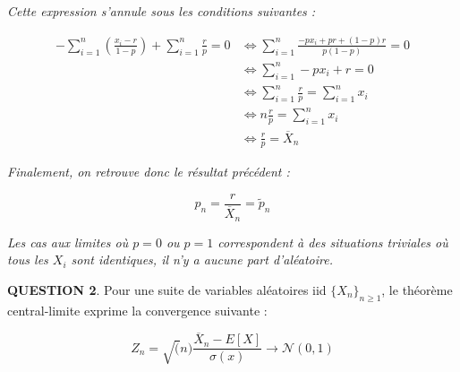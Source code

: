 \documentclass[a4paper,11pt]{article}
\newcommand{\quest}[1]{\small\textbf{#1}\normalsize}
\theoremstyle{nonumberplain}
\theoremstyle{nonumberplain}
\theoremstyle{nonumberplain}
\begin{document}
\begin{calculs}
        \newpage
        \emph{}\newline
        \emph{Cette expression s'annule sous les conditions suivantes :}

        \vspace{-2ex}
        \begin{equation*}
        \begin{split}
            - \sum\limits_{i = 1}^{n} (\frac{x_i - r}{1 - p}) + \sum\limits_{i = 1}^{n} \frac{r}{p} = 0 & \iff \sum\limits_{i = 1}^{n} \frac{-px_i + pr + (1 - p)r}{p(1-p)} = 0 \\
              & \iff \sum\limits_{i = 1}^{n} -px_i + r = 0 \\
              & \iff \sum\limits_{i = 1}^{n} \frac{r}{p} = \sum\limits_{i = 1}^{n} x_i \\
              & \iff n\frac{r}{p} = \sum\limits_{i = 1}^{n} x_i \\
              & \iff \frac{r}{p} = \overline{X}_n
        \end{split}
        \end{equation*}

        \emph{Finalement, on retrouve donc le résultat précédent :}

        $$\hat{p}_n = \frac{r}{\overline{X}_n} = \tilde{p}_n$$

        \medskip
        \emph{Les cas aux limites où $p = 0$ ou $p = 1$ correspondent
        à des situations triviales où tous les $X_i$ sont identiques, il n'y a aucune part d'aléatoire.}
    \end{calculs}

    \bigskip
    \bigskip
    \quest{QUESTION 2}. Pour une suite de variables aléatoires
    iid $\{X_n\}_{n \ge 1}$, le théorème central-limite exprime la convergence
    suivante :

    \[
        Z_n = \sqrt(n)\frac{\overline{X}_n - E[X]}{\sigma(x)} \rightarrow \mathcal{N}(0, 1)
    \]
\end{document}
